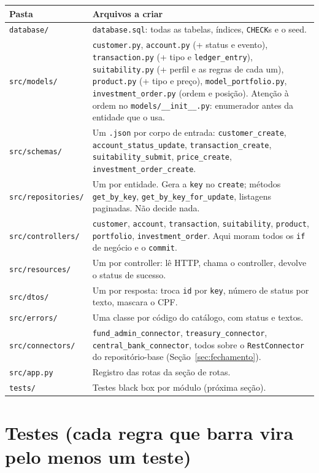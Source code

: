 \documentclass[11pt,a4paper]{article}
\newcommand{\tb}[1]{\texttt{#1}}           %
\begin{document}
\begingroup\small
\begin{longtable}{@{}P{3.6cm}P{12.5cm}@{}}
\toprule
\textbf{Pasta} & \textbf{Arquivos a criar} \\
\midrule
\endhead
\tb{database/} & \tb{database.sql}: todas as tabelas, índices, \tb{CHECK}s e o seed. \\
\tb{src/models/} & \tb{customer.py}, \tb{account.py} (+ status e evento), \tb{transaction.py} (+ tipo e \tb{ledger_entry}), \tb{suitability.py} (+ perfil e as regras de cada um), \tb{product.py} (+ tipo e preço), \tb{model_portfolio.py}, \tb{investment_order.py} (ordem e posição). Atenção à ordem no \tb{models/__init__.py}: enumerador antes da entidade que o usa. \\
\tb{src/schemas/} & Um \tb{.json} por corpo de entrada: \tb{customer_create}, \tb{account_status_update}, \tb{transaction_create}, \tb{suitability_submit}, \tb{price_create}, \tb{investment_order_create}. \\
\tb{src/repositories/} & Um por entidade. Gera a \tb{key} no \tb{create}; métodos \tb{get_by_key}, \tb{get_by_key_for_update}, listagens paginadas. Não decide nada. \\
\tb{src/controllers/} & \tb{customer}, \tb{account}, \tb{transaction}, \tb{suitability}, \tb{product}, \tb{portfolio}, \tb{investment_order}. Aqui moram todos os \tb{if} de negócio e o \tb{commit}. \\
\tb{src/resources/} & Um por controller: lê HTTP, chama o controller, devolve o status de sucesso. \\
\tb{src/dtos/} & Um por resposta: troca \tb{id} por \tb{key}, número de status por texto, mascara o CPF. \\
\tb{src/errors/} & Uma classe por código do catálogo, com status e textos. \\
\tb{src/connectors/} & \tb{fund_admin_connector}, \tb{treasury_connector}, \tb{central_bank_connector}, todos sobre o \tb{RestConnector} do repositório-base (Seção~\ref{sec:fechamento}). \\
\tb{src/app.py} & Registro das rotas da seção de rotas. \\
\tb{tests/} & Testes black box por módulo (próxima seção). \\
\bottomrule
\end{longtable}
\endgroup

\section{Testes (cada regra que barra vira pelo menos um teste)}
\end{document}
